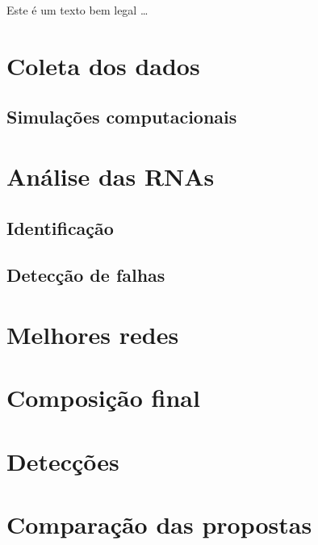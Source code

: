 Este é um texto bem legal \ldots

\section{Coleta dos dados}

\subsection{Simulações computacionais}


\section{Análise das RNAs}

\subsection{Identificação}

\subsection{Detecção de falhas}

\section{Melhores redes}

\section{Composição final}

\section{Detecções}

\section{Comparação das propostas}
